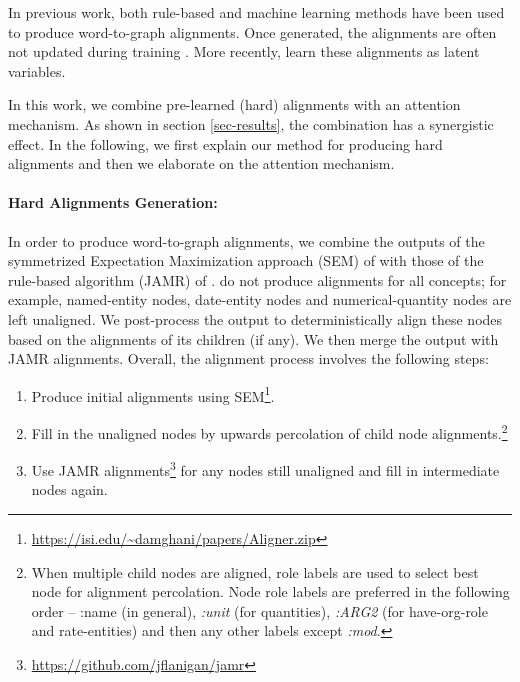 \documentclass[11pt,a4paper]{article}
\begin{document}
In previous work, both rule-based \cite{flanigan2014discriminative} and machine learning \cite{pourdamghani2014aligning} methods have been used to produce word-to-graph alignments. Once generated, the alignments are often not updated during training \cite{flanigan2016cmu,damonte2016incremental,wang2017getting,foland2017abstract}. More recently,  learn these alignments as latent variables. 

In this work, we combine pre-learned (hard) alignments with an attention mechanism. As shown in section \ref{sec-results}, the combination has a synergistic effect. In the following, we first explain our method for producing hard alignments and then we elaborate on the attention mechanism.  

\paragraph{Hard Alignments Generation:} 

In order to produce word-to-graph alignments, we combine the outputs of the symmetrized Expectation Maximization approach (SEM) of  with those of the rule-based algorithm (JAMR) of .  do not produce alignments for all concepts; for example, named-entity nodes, date-entity nodes and  numerical-quantity nodes are left unaligned. We post-process the output to deterministically align these nodes based on the alignments of its children (if any). We then merge the output with JAMR alignments. Overall, the alignment process involves the following steps:



\begin{enumerate}
    \item Produce initial alignments using SEM\footnote{\url{https://isi.edu/~damghani/papers/Aligner.zip}}.
    \item Fill in the unaligned nodes by upwards percolation of child node alignments.\footnote{When multiple child nodes are aligned, role labels are used to select best node for alignment percolation. Node role labels are preferred in the following order -- :name (in general), \emph{:unit} (for quantities), \emph{:ARG2} (for have-org-role and rate-entities) and then any other labels except \emph{:mod}.}
    \item Use JAMR alignments\footnote{\url{https://github.com/jflanigan/jamr}} for any nodes still unaligned and fill in intermediate nodes again.
\end{enumerate}
\end{document}
